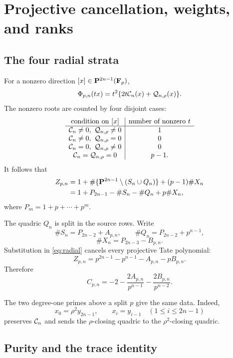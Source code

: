 \section{Projective cancellation, weights, and ranks}\label{sec:weights}

\subsection{The four radial strata}

For a nonzero direction \([x]\in\mathbf P^{2n-1}(\mathbf F_p)\),
\[
 \Phi_{p,n}(tx)=t^2\{2t\mathcal C_n(x)+\mathcal Q_{n,\rho}(x)\}.
\]
The nonzero roots are counted by four disjoint cases:
\[
\begin{array}{c|c}
\text{condition on }[x]&\text{number of nonzero }t\\ \hline
\mathcal C_n\ne0,\ \mathcal Q_{n,\rho}\ne0&1\\
\mathcal C_n\ne0,\ \mathcal Q_{n,\rho}=0&0\\
\mathcal C_n=0,\ \mathcal Q_{n,\rho}\ne0&0\\
\mathcal C_n=\mathcal Q_{n,\rho}=0&p-1.
\end{array}
\]
It follows that
\begin{equation}\label{eq:radial}
\begin{aligned}
 Z_{p,n}
 &=1+\#\{\mathbf P^{2n-1}\setminus(S_n\cup Q_n)\}+(p-1)\#X_n\\
 &=1+P_{2n-1}-\#S_n-\#Q_n+p\#X_n,
\end{aligned}
\end{equation}
where \(P_m=1+p+\cdots+p^m\).

The quadric \(Q_n\) is split in the source rows.  Write
\[
 \#S_n=P_{2n-2}+A_{p,n},\qquad
 \#Q_n=P_{2n-2}+p^{n-1},
\]
\[
 \#X_n=P_{2n-3}-B_{p,n}.
\]
Substitution in \eqref{eq:radial} cancels every projective Tate polynomial:
\begin{equation}\label{eq:z-cancel}
 Z_{p,n}=p^{2n-1}-p^{n-1}-A_{p,n}-pB_{p,n}.
\end{equation}
Therefore
\begin{equation}\label{eq:c-cancel}
 C_{p,n}=-2-\frac{2A_{p,n}}{p^{n-1}}
              -\frac{2B_{p,n}}{p^{n-2}}.
\end{equation}

The two degree-one primes above a split \(p\) give the same data.  Indeed,
\[
 x_0=\rho^2y_{2n-1},\qquad x_i=y_{i-1}\quad(1\le i\le2n-1)
\]
preserves \(\mathcal C_n\) and sends the \(\rho\)-closing quadric to the
\(\rho^2\)-closing quadric.

\subsection{Purity and the trace identity}

